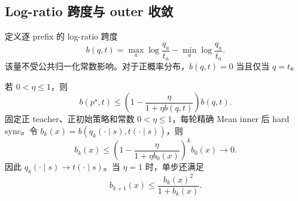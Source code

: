 \documentclass[lang=cn,scheme=chinese,openany]{../book/elegantbook}
\begin{document}
\subsection{Log-ratio 跨度与 outer 收敛}

定义逐 prefix 的 log-ratio 跨度
\begin{equation}
 b(q,t)=\max_a\log\frac{q_a}{t_a}
        -\min_a\log\frac{q_a}{t_a}.
 \label{dyn:eq:mean-opd-span}
\end{equation}
该量不受公共归一化常数影响。对于正概率分布，$b(q,t)=0$ 当且仅当 $q=t$。

\begin{theorem}
\label{dyn:thm:mean-opd-span-convergence}
若 $0<\eta\le1$，则
\begin{equation}
 b(p^\star,t)
 \le\left(1-\frac{\eta}{1+\eta b(q,t)}\right)b(q,t).
 \label{dyn:eq:mean-opd-span-step}
\end{equation}
固定正 teacher、正初始策略和常数 $0<\eta\le1$，每轮精确 Mean inner 后 hard sync。令 $b_k(x)=b(q_k(\cdot\mid s),t(\cdot\mid s))$，则
\begin{equation}
 b_k(x)\le
 \left(1-\frac{\eta}{1+\eta b_0(x)}\right)^k b_0(x)
 \longrightarrow0.
 \label{dyn:eq:mean-opd-span-geometric}
\end{equation}
因此 $q_k(\cdot\mid s)\to t(\cdot\mid s)$。当 $\eta=1$ 时，单步还满足
\begin{equation}
 b_{k+1}(x)\le\frac{b_k(x)^2}{1+b_k(x)}.
 \label{dyn:eq:mean-opd-span-quadratic}
\end{equation}
\end{theorem}
\end{document}
